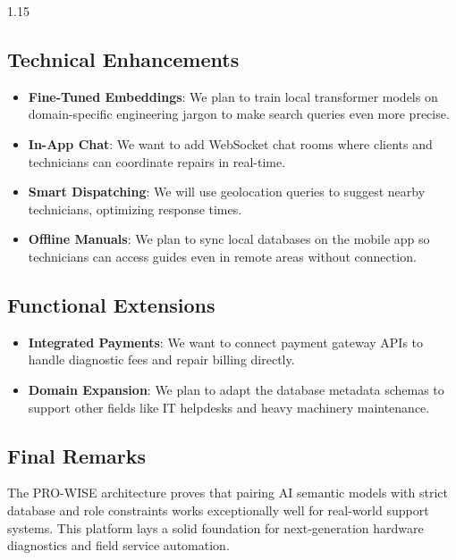 \documentclass[12pt,a4paper]{report}
\begin{document}
\begin{spacing}{1.15}
\subsection*{Technical Enhancements}
\begin{itemize}
    \item \textbf{Fine-Tuned Embeddings}: We plan to train local transformer models on domain-specific engineering jargon to make search queries even more precise.
    \item \textbf{In-App Chat}: We want to add WebSocket chat rooms where clients and technicians can coordinate repairs in real-time.
    \item \textbf{Smart Dispatching}: We will use geolocation queries to suggest nearby technicians, optimizing response times.
    \item \textbf{Offline Manuals}: We plan to sync local databases on the mobile app so technicians can access guides even in remote areas without connection.
\end{itemize}

\subsection*{Functional Extensions}
\begin{itemize}
    \item \textbf{Integrated Payments}: We want to connect payment gateway APIs to handle diagnostic fees and repair billing directly.
    \item \textbf{Domain Expansion}: We plan to adapt the database metadata schemas to support other fields like IT helpdesks and heavy machinery maintenance.
\end{itemize}

\subsection*{Final Remarks}

The PRO-WISE architecture proves that pairing AI semantic models with strict database and role constraints works exceptionally well for real-world support systems. This platform lays a solid foundation for next-generation hardware diagnostics and field service automation.

\end{spacing}
\end{document}
